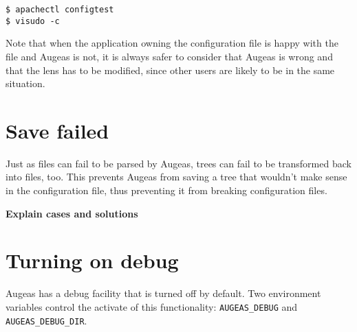 \begin{verbatim}
$ apachectl configtest
$ visudo -c
\end{verbatim}

Note that when the application owning the configuration file is happy with the file and Augeas is not, it is always safer to consider that Augeas is wrong and that the lens has to be modified, since other users are likely to be in the same situation.

\section{Save failed}

Just as files can fail to be parsed by Augeas, trees can fail to be transformed back into files, too. This prevents Augeas from saving a tree that wouldn't make sense in the configuration file, thus preventing it from breaking configuration files.

\textbf{Explain cases and solutions}

\section{Turning on debug}

 

Augeas has a debug facility that is turned off by default. Two environment variables control the activate of this functionality: \verb!AUGEAS_DEBUG! and \verb!AUGEAS_DEBUG_DIR!.


